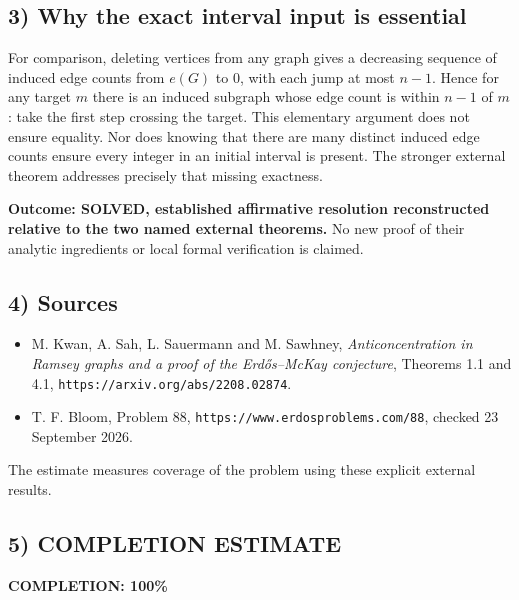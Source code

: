 \subsection{3) Why the exact interval input is essential}
For comparison, deleting vertices from any graph gives a decreasing
sequence of induced edge counts from $e(G)$ to $0$, with each jump
at most $n-1$. Hence for any target $m$ there is an induced subgraph
whose edge count is within $n-1$ of $m$: take the first step crossing
the target. This elementary argument does not ensure equality.
Nor does knowing that there are many distinct induced edge counts
ensure every integer in an initial interval is present. The stronger
external theorem addresses precisely that missing exactness.

\textbf{Outcome: SOLVED, established affirmative resolution
reconstructed relative to the two named external theorems.}
No new proof of their analytic ingredients or local formal
verification is claimed.

\subsection{4) Sources}
\begin{itemize}
\item M. Kwan, A. Sah, L. Sauermann and M. Sawhney,
\emph{Anticoncentration in Ramsey graphs and a proof of the
Erd\H{o}s--McKay conjecture}, Theorems 1.1 and 4.1,
\texttt{https://arxiv.org/abs/2208.02874}.
\item T. F. Bloom, Problem 88,
\texttt{https://www.erdosproblems.com/88}, checked 23 September 2026.
\end{itemize}
The estimate measures coverage of the problem using these explicit
external results.
\subsection{5) COMPLETION ESTIMATE}
\textbf{COMPLETION: 100\%}
